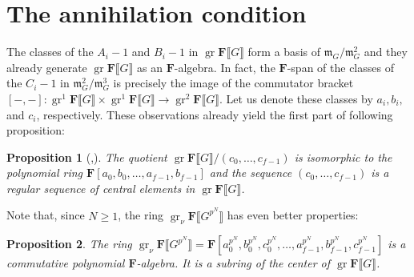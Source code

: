 \documentclass[11pt, oneside]{article}
\DeclareMathOperator{\gr}{gr}
\newtheorem{proposition}{Proposition}
\theoremstyle{definition}
\begin{document}
	\section{The annihilation condition}
	The classes of the $A_i-1$ and $B_i-1$ in $\gr\mathbf F\llbracket G\rrbracket$ form a basis of $\mathfrak m_G/\mathfrak m_G^2$ and they already generate $\gr\mathbf F\llbracket G\rrbracket$ as an $\mathbf F$-algebra. In fact, the $\mathbf F$-span of the classes of the $C_i-1$ in $\mathfrak m_G^2/\mathfrak m_G^3$ is precisely the image of the commutator bracket $[-,-]\colon\gr^1\mathbf F\llbracket G\rrbracket\times\gr^1\mathbf F\llbracket G\rrbracket\to\gr^2\mathbf F\llbracket G\rrbracket$. Let us denote these classes by $a_i,b_i,$ and $c_i$, respectively. These observations already yield the first part of following proposition:
	\begin{proposition}[{\cite[Thm.~5.3.4]{BHHMS1}},{\cite[Thm.~2.6]{hu2024modprepresentationsquaternion}}]
		The quotient $\gr\mathbf F\llbracket G\rrbracket/(c_0,\dots,c_{f-1})$ is isomorphic to the polynomial ring $\mathbf F[a_0,b_0,\dots,a_{f-1},b_{f-1}]$ and the sequence  $(c_0,\dots,c_{f-1})$ is a regular sequence of central elements in $\gr\mathbf F\llbracket G\rrbracket$.
	\end{proposition}
	Note that, since $N\geq1$, the ring $\gr_\nu\mathbf F\llbracket G^{p^N}\rrbracket$ has even better properties:
	\begin{proposition}\label{centrality}
		The ring $\gr_\nu\mathbf F\llbracket G^{p^N}\rrbracket=\mathbf F[a_0^{p^N},b_0^{p^N},c_0^{p^N},\dots,a_{f-1}^{p^N},b_{f-1}^{p^N},c_{f-1}^{p^N}]$ is a commutative polynomial $\mathbf F$-algebra. It is a subring of the center of $\gr\mathbf F\llbracket G\rrbracket$.
	\end{proposition}
\end{document}
